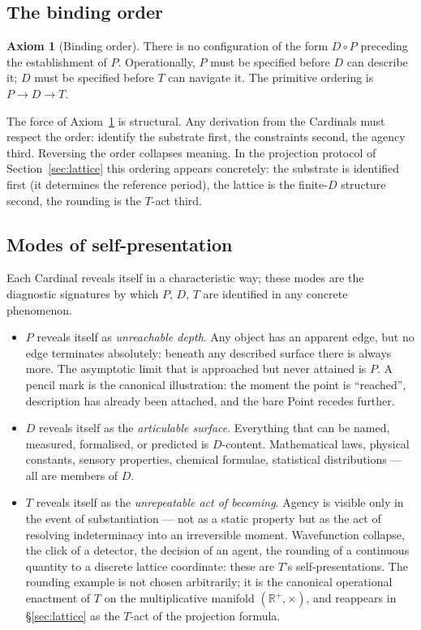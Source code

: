 \documentclass[11pt,a4paper]{article}
\theoremstyle{definition}
\newtheorem{axiom}[theorem]{Axiom}
\theoremstyle{remark}
\newcommand{\R}{\mathbb{R}}
\begin{document}
\subsection{The binding order}

\begin{axiom}[Binding order]\label{ax:order}
There is no configuration of the form $D \circ P$ preceding the establishment of $P$. Operationally, $P$ must be specified before $D$ can describe it; $D$ must be specified before $T$ can navigate it. The primitive ordering is $P \to D \to T$.
\end{axiom}

The force of Axiom~\ref{ax:order} is structural. Any derivation from the Cardinals must respect the order: identify the substrate first, the constraints second, the agency third. Reversing the order collapses meaning. In the projection protocol of Section~\ref{sec:lattice} this ordering appears concretely: the substrate is identified first (it determines the reference period), the lattice is the finite-$D$ structure second, the rounding is the $T$-act third.

\subsection{Modes of self-presentation}\label{subsec:modes}

Each Cardinal reveals itself in a characteristic way; these modes are the diagnostic signatures by which $P$, $D$, $T$ are identified in any concrete phenomenon.

\begin{itemize}[leftmargin=*]
\item $P$ reveals itself as \emph{unreachable depth}. Any object has an apparent edge, but no edge terminates absolutely: beneath any described surface there is always more. The asymptotic limit that is approached but never attained is $P$. A pencil mark is the canonical illustration: the moment the point is ``reached'', description has already been attached, and the bare Point recedes further.
\item $D$ reveals itself as the \emph{articulable surface}. Everything that can be named, measured, formalised, or predicted is $D$-content. Mathematical laws, physical constants, sensory properties, chemical formulae, statistical distributions --- all are members of $D$.
\item $T$ reveals itself as the \emph{unrepeatable act of becoming}. Agency is visible only in the event of substantiation --- not as a static property but as the act of resolving indeterminacy into an irreversible moment. Wavefunction collapse, the click of a detector, the decision of an agent, the rounding of a continuous quantity to a discrete lattice coordinate: these are $T$'s self-presentations. The rounding example is not chosen arbitrarily; it is the canonical operational enactment of $T$ on the multiplicative manifold $(\R^{+},\times)$, and reappears in \S\ref{sec:lattice} as the $T$-act of the projection formula.
\end{itemize}
\end{document}
